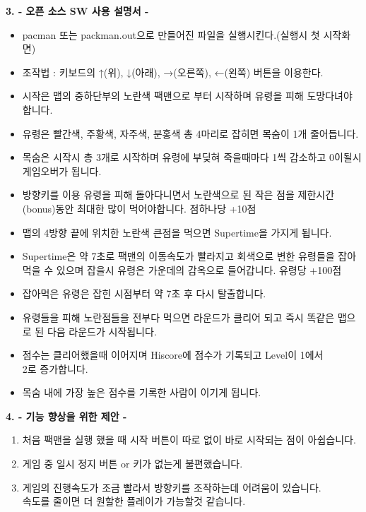 \documentclass{article}
\begin{document}
\newpage
\begin{large}\textbf{3. - 오픈 소스 SW 사용 설명서 -}\end{large}
\begin{itemize}
\item pacman 또는 packman.out으로 만들어진 파일을 실행시킨다.(실행시 첫 시작화면)
\item 조작법 : 키보드의 ↑(위), ↓(아래), →(오른쪽), ←(왼쪽) 버튼을 이용한다.
\item 시작은 맵의 중하단부의 노란색 팩맨으로 부터 시작하며 유령을 피해 도망다녀야 합니다.
\item 유령은 빨간색, 주황색, 자주색, 분홍색 총 4마리로 잡히면 목숨이 1개 줄어듭니다.
\item 목숨은 시작시 총 3개로 시작하며 유령에 부딪혀 죽을때마다 1씩 감소하고 0이될시 게임오버가 됩니다.
\item 방향키를 이용 유령을 피해 돌아다니면서 노란색으로 된 작은 점을 제한시간(bonus)동안 최대한 많이 먹어야합니다. 점하나당 +10점
\item 맵의 4방향 끝에 위치한 노란색 큰점을 먹으면 Supertime을 가지게 됩니다.
\item Supertime은 약 7초로 팩맨의 이동속도가 빨라지고 회색으로 변한 유령들을 잡아먹을 수 있으며 잡을시 유령은 가운데의 감옥으로 들어갑니다. 유령당 +100점
\item 잡아먹은 유령은 잡힌 시점부터 약 7초 후 다시 탈출합니다.
\item 유령들을 피해 노란점들을 전부다 먹으면 라운드가 클리어 되고 즉시 똑같은 맵으로 된 다음 라운드가 시작됩니다.
\item 점수는 클리어했을때 이어지며 Hiscore에 점수가 기록되고 Level이 1에서\\ 2로 증가합니다.
\item 목숨 내에 가장 높은 점수를 기록한 사람이 이기게 됩니다.
\end{itemize}

\newpage

\begin{large}\textbf{4. - 기능 향상을 위한 제안 -}\end{large}
\begin{enumerate}
\item 처음 팩맨을 실행 했을 때 시작 버튼이 따로 없이 바로 시작되는 점이 아쉽습니다.
\item 게임 중 일시 정지 버튼 or 키가 없는게 불편했습니다.
\item 게임의 진행속도가 조금 빨라서 방향키를 조작하는데 어려움이 있습니다.\\ 속도를 줄이면 더 원할한 플레이가 가능할것 같습니다.
\end{enumerate}
\end{document}
